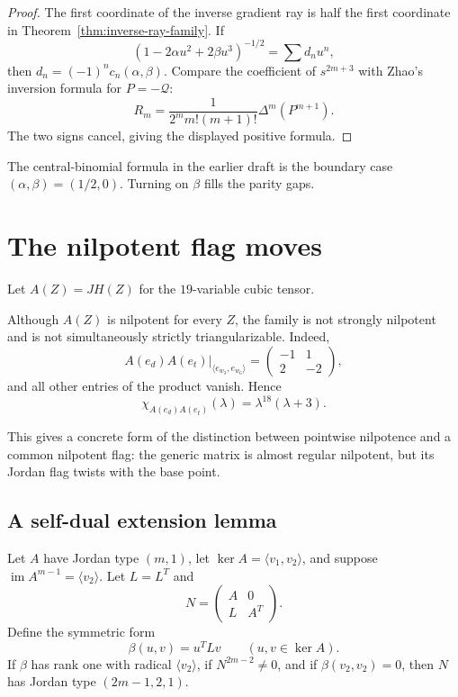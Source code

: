 \begin{proof}
The first coordinate of the inverse gradient ray is half the first coordinate
in Theorem~\ref{thm:inverse-ray-family}.  If
\[
(1-2\alpha u^2+2\beta u^3)^{-1/2}=\sum d_nu^n,
\]
then $d_n=(-1)^nc_n(\alpha,\beta)$.  Compare the coefficient of $s^{2m+3}$
with Zhao's inversion formula for $P=-\mathcal Q$:
\[
R_m=\frac{1}{2^m m!(m+1)!}\Delta^m(P^{m+1}).
\]
The two signs cancel, giving the displayed positive formula.
\end{proof}

The central-binomial formula in the earlier draft is the boundary case
$(\alpha,\beta)=(1/2,0)$.  Turning on $\beta$ fills the parity gaps.

\section{The nilpotent flag moves}
\label{sec:moving-flag}

Let $A(Z)=JH(Z)$ for the $19$-variable cubic tensor.

\begin{proposition}
\label{prop:not-strongly-nilpotent}
Although $A(Z)$ is nilpotent for every $Z$, the family is not strongly
nilpotent and is not simultaneously strictly triangularizable.  Indeed,
\[
A(e_d)A(e_t)|_{\langle e_{w_3},e_{w_6}\rangle}
 =\begin{pmatrix}-1&1\\2&-2\end{pmatrix},
\]
and all other entries of the product vanish.  Hence
\[
\chi_{A(e_d)A(e_t)}(\lambda)=\lambda^{18}(\lambda+3).
\]
\end{proposition}

This gives a concrete form of the distinction between pointwise nilpotence and
a common nilpotent flag: the generic matrix is almost regular nilpotent, but
its Jordan flag twists with the base point.

\subsection{A self-dual extension lemma}

\begin{lemma}
\label{lem:self-dual-extension}
Let $A$ have Jordan type $(m,1)$, let
$\ker A=\langle v_1,v_2\rangle$, and suppose
$\operatorname{im}A^{m-1}=\langle v_2\rangle$.  Let $L=L^T$ and
\[
N=\begin{pmatrix}A&0\\L&A^T\end{pmatrix}.
\]
Define the symmetric form
\[
\beta(u,v)=u^TLv\qquad(u,v\in\ker A).
\]
If $\beta$ has rank one with radical $\langle v_2\rangle$, if
$N^{2m-2}\ne0$, and if $\beta(v_2,v_2)=0$, then $N$ has Jordan type
$(2m-1,2,1)$.
\end{lemma}

